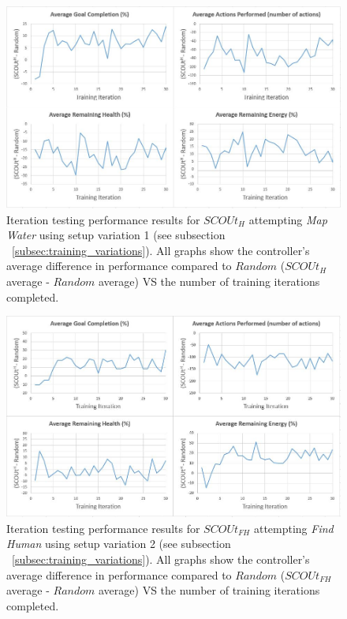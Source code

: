 \begin{figure}[H]
  \includegraphics[width=1.0\columnwidth]{Figures/Results/TrainingVariation1/Hybrid-MapWater.JPG}
  \caption{Iteration testing performance results for $SCOUt_{H}$ attempting \textit{Map Water} using setup variation 1 (see subsection ~\ref{subsec:training_variations}). All graphs show the controller's average difference in performance compared to $Random$ ($SCOUt_{H}$ average - $Random$ average) VS the number of training iterations completed.}
  \label{fig:hybrid_training_mw_variation1}
\end{figure}

\begin{figure}[H]
  \includegraphics[width=1.0\columnwidth]{Figures/Results/TrainingVariation2/FindHuman.JPG}
  \caption{Iteration testing performance results for $SCOUt_{FH}$ attempting \textit{Find Human} using setup variation 2 (see subsection ~\ref{subsec:training_variations}). All graphs show the controller's average difference in performance compared to $Random$ ($SCOUt_{FH}$ average - $Random$ average) VS the number of training iterations completed.}
  \label{fig:findhuman_training_variation2}
\end{figure}

